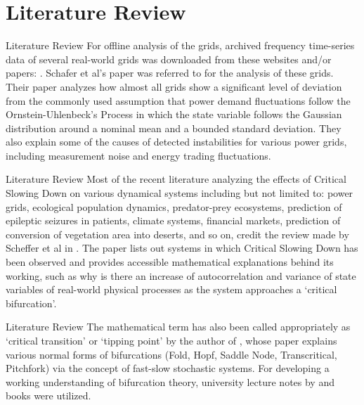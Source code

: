 \section[Literature Review]{Literature Review}
\begin{frame}{Literature Review}
	For offline analysis of the grids, archived frequency time-series data of several real-world grids was downloaded from these websites and/or papers: \cite{lrydin01, lrydinGithub, tokyo2017, tokyo2020, nordic2018, nordic2019, ce2019, ce2020,  ukNationalGridESOData}. Schafer et al's paper \cite{schafer01} was referred to for the analysis of these grids. Their paper  analyzes how almost all grids show a significant level of deviation from the commonly used assumption that power demand fluctuations follow the Ornstein-Uhlenbeck's Process in which the state variable follows the Gaussian distribution around a nominal mean and a bounded standard deviation. They also explain some of the causes of detected instabilities for various power grids, including measurement noise and energy trading fluctuations.
\end{frame}

\begin{frame}{Literature Review}
	Most of the recent literature analyzing the effects of Critical Slowing Down on various dynamical systems including but not limited to: power grids, ecological population dynamics, predator-prey ecosystems, prediction of epileptic seizures in patients, climate systems, financial markets, prediction of conversion of vegetation area into deserts, and so on, credit the review made by Scheffer et al in \cite{schefferEarlyWarningSignalsForCriticalTransitions}. The paper lists out systems in which Critical Slowing Down has been observed and provides accessible mathematical explanations behind its working, such as why is there an increase of autocorrelation and variance of state variables of real-world physical processes as the system approaches a `critical bifurcation'. 
\end{frame}	

\begin{frame}{Literature Review}
	The mathematical term has also been called appropriately as `critical transition' or `tipping point' by the author of \cite{kuehnMathematicalFrameworkForCriticalTransitions}, whose paper explains various normal forms of bifurcations (Fold, Hopf, Saddle Node, Transcritical, Pitchfork) via the concept of fast-slow stochastic systems. For developing a working understanding of bifurcation theory, university lecture notes by \cite{nathanKutzNotesOnBifurcationTheoryAndNormalForms} and books \cite{chenBifurcationsAndChaosInEngineering, mohlerDyanmicsAndControlPartOne} were utilized.  
\end{frame}

